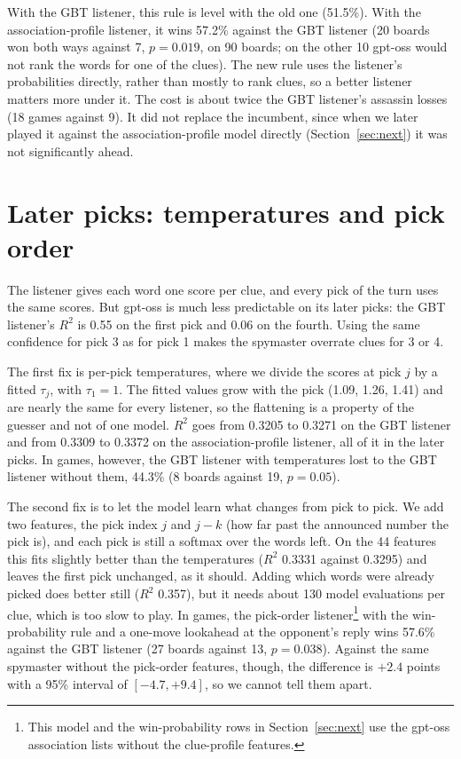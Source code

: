 \documentclass[11pt]{article}
\begin{document}
With the GBT listener, this rule is level with the old one (51.5\%). With the
association-profile listener, it wins 57.2\% against the GBT listener (20 boards
won both ways against 7, $p = 0.019$, on 90 boards; on the other 10 gpt-oss would
not rank the words for one of the clues). The new rule uses the listener's
probabilities directly, rather than mostly to rank clues, so a better listener
matters more under it. The cost is about twice the GBT listener's assassin losses
(18 games against 9). It did not replace the incumbent, since when we later
played it against the association-profile model directly (Section~\ref{sec:next})
it was not significantly ahead.

\section{Later picks: temperatures and pick order}

The listener gives each word one score per clue, and every pick of the turn uses
the same scores. But gpt-oss is much less predictable on its later picks: the
GBT listener's $R^2$ is 0.55 on the first pick and 0.06 on the fourth. Using the
same confidence for pick 3 as for pick 1 makes the spymaster overrate clues for 3
or 4.

The first fix is per-pick temperatures, where we divide the scores at pick $j$ by
a fitted $\tau_j$, with $\tau_1 = 1$. The fitted values grow with the pick (1.09,
1.26, 1.41) and are nearly the same for every listener, so the flattening is a
property of the guesser and not of one model. $R^2$ goes from 0.3205 to 0.3271
on the GBT listener and from 0.3309 to 0.3372 on the association-profile
listener, all of it in the later picks. In games, however, the GBT listener with
temperatures lost to the GBT listener without them, 44.3\% (8 boards against 19,
$p = 0.05$).

The second fix is to let the model learn what changes from pick to pick. We add
two features, the pick index $j$ and $j - k$ (how far past the announced number
the pick is), and each pick is still a softmax over the words left. On the 44
features this fits slightly better than the temperatures ($R^2$ 0.3331 against
0.3295) and leaves the first pick unchanged, as it should. Adding which words
were already picked does better still ($R^2$ 0.357), but it needs about 130 model
evaluations per clue, which is too slow to play. In games, the pick-order
listener\footnote{This model and the win-probability rows in
Section~\ref{sec:next} use the gpt-oss association lists without the clue-profile
features.} with the win-probability rule and a one-move lookahead at the
opponent's reply wins 57.6\% against the GBT listener (27 boards against 13, $p =
0.038$). Against the same spymaster without the pick-order features, though, the
difference is $+2.4$ points with a 95\% interval of $[-4.7, +9.4]$, so we cannot
tell them apart.
\end{document}
